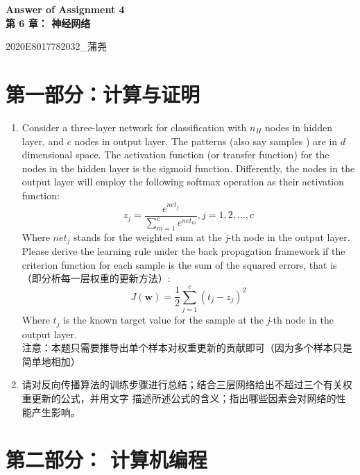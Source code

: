 \documentclass[a4paper,11pt,onecolumn,oneside,UTF8]{article}
\begin{document}
\begin{center}
    \Large\textbf{Answer of Assignment 4\\第 6 章： 神经网络}
\end{center}

\begin{flushright}
    2020E8017782032\_蒲尧
\end{flushright}

\section*{第一部分：计算与证明}

\begin{enumerate}
    \item
          Consider a three-layer network for classification with $n_H$ nodes in hidden layer, and $c$ nodes in
          output layer. The patterns (also say samples ) are in $d$ dimensional space. The activation
          function (or transfer function) for the nodes in the hidden layer is the sigmoid function.
          Differently, the nodes in the output layer will employ the following softmax operation as their
          activation function:
          $$
              z_j=\frac{e^{net_j}}{\sum\limits_{m=1}^ce^{net_m}},j=1,2,...,c
          $$
          Where $net_j$ stands for the weighted sum at the \emph{j}-th node in the output layer.\\
          Please derive the learning rule under the back propagation framework if the criterion function
          for each sample is the sum of the squared errors, that is （即分析每一层权重的更新方法）:
          $$
              J\left(\bm w\right)=\frac{1}{2}\sum\limits_{j=1}^c\left(t_j-z_j\right)^2
          $$
          Where $t_j$ is the known target value for the sample at the \emph{j}-th node in the output layer.\\
          注意：本题只需要推导出单个样本对权重更新的贡献即可（因为多个样本只是简单地相加）
    \item 请对反向传播算法的训练步骤进行总结；结合三层网络给出不超过三个有关权重更新的公式，并用文字
          描述所述公式的含义；指出哪些因素会对网络的性能产生影响。

\end{enumerate}

\section*{第二部分： 计算机编程}
\end{document}
